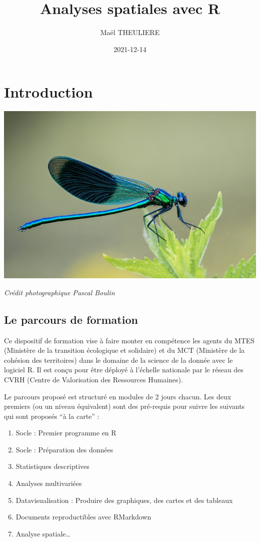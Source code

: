 \documentclass[
]{book}
\title{Analyses spatiales avec R}
\author{Maël THEULIERE}
\date{2021-12-14}
\providecommand{\tightlist}{%
  \setlength{\itemsep}{0pt}\setlength{\parskip}{0pt}}
\begin{document}
\maketitle

{
\setcounter{tocdepth}{1}
\tableofcontents
}
\hypertarget{introduction}{%
\chapter*{Introduction}\label{introduction}}

\includegraphics{pic/odonate.jpg}

\emph{Crédit photographique Pascal Boulin}

\hypertarget{le-parcours-de-formation}{%
\section*{Le parcours de formation}\label{le-parcours-de-formation}}

Ce dispositif de formation vise à faire monter en compétence les agents du MTES (Ministère de la transition écologique et solidaire) et du MCT (Ministère de la cohésion des territoires) dans le domaine de la science de la donnée avec le logiciel R. Il est conçu pour être déployé à l'échelle nationale par le réseau des CVRH (Centre de Valorisation des Ressources Humaines).

Le parcours proposé est structuré en modules de 2 jours chacun. Les deux premiers (ou un niveau équivalent) sont des pré-requis pour suivre les suivants qui sont proposés ``à la carte'' :

\begin{enumerate}
\def\labelenumi{\arabic{enumi}.}
\tightlist
\item
  Socle : Premier programme en R
\item
  Socle : Préparation des données
\item
  Statistiques descriptives
\item
  Analyses multivariées
\item
  Datavisualisation : Produire des graphiques, des cartes et des tableaux
\item
  Documents reproductibles avec RMarkdown
\item
  Analyse spatiale\ldots{}
\end{enumerate}
\end{document}
